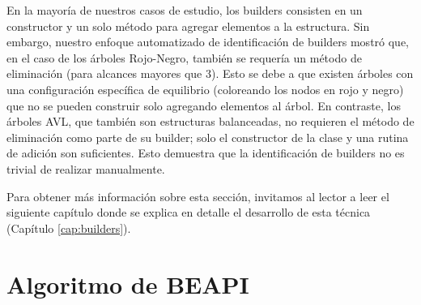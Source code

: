 En la mayoría de nuestros casos de estudio, los builders consisten en un constructor y un solo método para agregar elementos a la estructura. Sin embargo, nuestro enfoque automatizado de identificación de builders mostró que, en el caso de los árboles Rojo-Negro, también se requería un método de eliminación (para alcances mayores que 3). Esto se debe a que existen árboles con una configuración específica de equilibrio (coloreando los nodos en rojo y negro) que no se pueden construir solo agregando elementos al árbol. En contraste, los árboles AVL, que también son estructuras balanceadas, no requieren el método de eliminación como parte de su builder; solo el constructor de la clase y una rutina de adición son suficientes. Esto demuestra que la identificación de builders no es trivial de realizar manualmente.

Para obtener más información sobre esta sección, invitamos al lector a leer el siguiente capítulo donde se explica en detalle el desarrollo de esta técnica (Capítulo \ref{cap:builders}).

\section{Algoritmo de BEAPI}
\label{sec:beapiTechnique}

